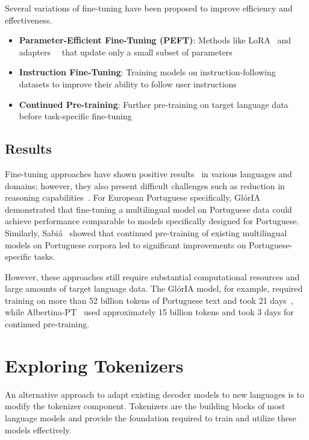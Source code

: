 Several variations of fine-tuning have been proposed to improve efficiency and effectiveness.

\begin{itemize}
    \item \textbf{Parameter-Efficient Fine-Tuning (PEFT)}: Methods like LoRA~\cite{hu2021lora} and adapters~\cite{houlsby2019parameter}~\cite{hu2023adapters} that update only a small subset of parameters
    \item \textbf{Instruction Fine-Tuning}: Training models on instruction-following datasets to improve their ability to follow user instructions~\cite{wei2021finetuned}
    \item \textbf{Continued Pre-training}: Further pre-training on target language data before task-specific fine-tuning~\cite{gururangan2020don}
\end{itemize}

\subsection{Results}
Fine-tuning approaches have shown positive results~\cite{xia2024finetuneperformance} in various languages and domains; however, they also present difficult challenges such as reduction in reasoning capabilities~\cite{khade2024lora}. For European Portuguese specifically, GlórIA~\cite{Gloria} demonstrated that fine-tuning a multilingual model on Portuguese data could achieve performance comparable to models specifically designed for Portuguese. Similarly, Sabiá~\cite{Sabia} showed that continued pre-training of existing multilingual models on Portuguese corpora led to significant improvements on Portuguese-specific tasks.

However, these approaches still require substantial computational resources and large amounts of target language data. The GlórIA model, for example, required training on more than 52 billion tokens of Portuguese text and took 21 days~\cite{Gloria}, while Albertina-PT~\cite{Albertina} used approximately 15 billion tokens and took 3 days for continued pre-training.

\section{Exploring Tokenizers}\label{Section3.2}
An alternative approach to adapt existing decoder models to new languages is to modify the tokenizer component. Tokenizers are the building blocks of most language models and provide the foundation required to train and utilize these models effectively.

